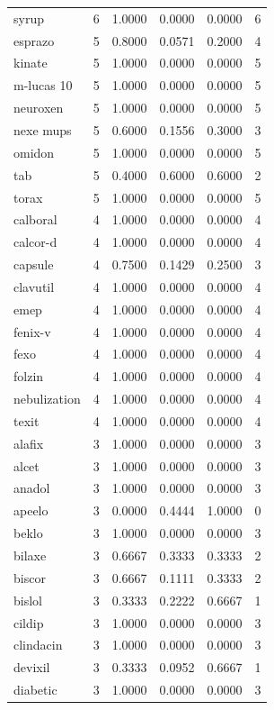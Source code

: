 \begin{longtable}{p{3.0cm}rrrrr}
syrup & 6 & 1.0000 & 0.0000 & 0.0000 & 6 \\
esprazo & 5 & 0.8000 & 0.0571 & 0.2000 & 4 \\
kinate & 5 & 1.0000 & 0.0000 & 0.0000 & 5 \\
m-lucas 10 & 5 & 1.0000 & 0.0000 & 0.0000 & 5 \\
neuroxen & 5 & 1.0000 & 0.0000 & 0.0000 & 5 \\
nexe mups & 5 & 0.6000 & 0.1556 & 0.3000 & 3 \\
omidon & 5 & 1.0000 & 0.0000 & 0.0000 & 5 \\
tab & 5 & 0.4000 & 0.6000 & 0.6000 & 2 \\
torax & 5 & 1.0000 & 0.0000 & 0.0000 & 5 \\
calboral & 4 & 1.0000 & 0.0000 & 0.0000 & 4 \\
calcor-d & 4 & 1.0000 & 0.0000 & 0.0000 & 4 \\
capsule & 4 & 0.7500 & 0.1429 & 0.2500 & 3 \\
clavutil & 4 & 1.0000 & 0.0000 & 0.0000 & 4 \\
emep & 4 & 1.0000 & 0.0000 & 0.0000 & 4 \\
fenix-v & 4 & 1.0000 & 0.0000 & 0.0000 & 4 \\
fexo & 4 & 1.0000 & 0.0000 & 0.0000 & 4 \\
folzin & 4 & 1.0000 & 0.0000 & 0.0000 & 4 \\
nebulization & 4 & 1.0000 & 0.0000 & 0.0000 & 4 \\
texit & 4 & 1.0000 & 0.0000 & 0.0000 & 4 \\
alafix & 3 & 1.0000 & 0.0000 & 0.0000 & 3 \\
alcet & 3 & 1.0000 & 0.0000 & 0.0000 & 3 \\
anadol & 3 & 1.0000 & 0.0000 & 0.0000 & 3 \\
apeelo & 3 & 0.0000 & 0.4444 & 1.0000 & 0 \\
beklo & 3 & 1.0000 & 0.0000 & 0.0000 & 3 \\
bilaxe & 3 & 0.6667 & 0.3333 & 0.3333 & 2 \\
biscor & 3 & 0.6667 & 0.1111 & 0.3333 & 2 \\
bislol & 3 & 0.3333 & 0.2222 & 0.6667 & 1 \\
cildip & 3 & 1.0000 & 0.0000 & 0.0000 & 3 \\
clindacin & 3 & 1.0000 & 0.0000 & 0.0000 & 3 \\
devixil & 3 & 0.3333 & 0.0952 & 0.6667 & 1 \\
diabetic & 3 & 1.0000 & 0.0000 & 0.0000 & 3 \\

\end{longtable}
